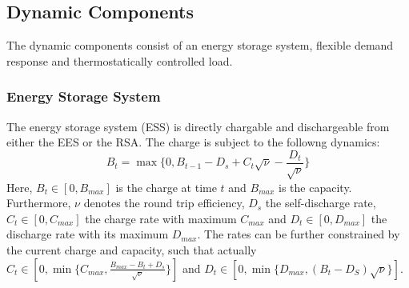 \subsection{Dynamic Components}\label{ssec:dynamic_components}
The dynamic components consist of an energy storage system, flexible demand response and thermostatically controlled load.

\subsubsection{Energy Storage System}
The energy storage system (ESS) is directly chargable and dischargeable from either the EES or the RSA. The charge is subject to the followng dynamics:
\begin{equation}
    B_t = \max\{0, B_{t-1} - D_s + C_t \sqrt{\nu} - \frac{D_t}{\sqrt{\nu}}\}
\end{equation}
Here, $B_t \in [0, B_{max}]$ is the charge at time $t$ and $B_{max}$ is the capacity. Furthermore, $\nu$ denotes the round trip efficiency, $D_s$ the self-discharge rate, $C_t \in [0, C_{max}]$ the charge rate with maximum $C_{max}$ and $D_t \in [0, D_{max}]$ the discharge rate with its maximum  $D_{max}$. The rates can be further constrained by the current charge and capacity, such that actually $C_t \in [0, \min\{C_{max}, \frac{B_{max} - B_t + D_s}{\sqrt{\nu}}\}]$ and $D_t \in [0, \min\{D_{max}, (B_t - D_S) \sqrt{\nu}\}]$.

